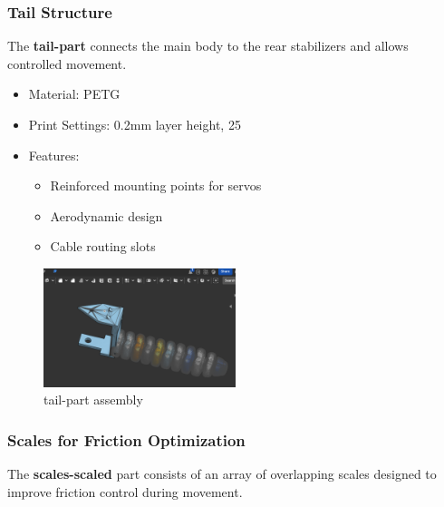 \documentclass[12pt,a4paper]{report}
\begin{document}
\FloatBarrier
\subsubsection{Tail Structure}

The \textbf{tail-part} connects the main body to the rear stabilizers and allows controlled movement.

\begin{itemize}
\item Material: PETG
\item Print Settings: 0.2mm layer height, 25%
\item Features:
\begin{itemize}
\item Reinforced mounting points for servos
\item Aerodynamic design
\item Cable routing slots
\end{itemize}
\end{itemize}
\begin{figure}[h]
\centering
\includegraphics[width=0.5\textwidth]{media/Tail-part.png}
\caption{tail-part assembly}
\end{figure}

\FloatBarrier
\subsubsection{Scales for Friction Optimization}

The \textbf{scales-scaled} part consists of an array of overlapping scales designed to improve friction control during movement.
\end{document}

